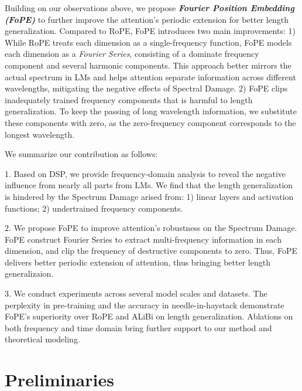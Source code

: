 Building on our observations above, we propose \textbf{\textit{Fourier Position Embedding (FoPE)}} to further improve the attention's periodic extension for better length generalization. Compared to RoPE, FoPE introduces two main improvements:
1) While RoPE treats each dimension as a single-frequency function, FoPE models each dimension as a \textit{Fourier Series}, consisting of a dominate frequency component and several harmonic components. This approach better mirrors the actual spectrum in LMs and helps attention separate information across different wavelengths, mitigating the negative effects of Spectral Damage.
2) FoPE clips inadequately trained frequency components that is harmful to length generalization. To keep the passing of long wavelength information, we substitute these components with zero, as the zero-frequency component corresponds to the longest wavelength.

We summarize our contribution as follows:

    1. Based on DSP, we provide frequency-domain analysis to reveal the negative influence from nearly all parts from LMs. We find that the length generalization is hindered by the Spectrum Damage arised from: 1) linear layers and activation functions; 2) undertrained frequency components. 

    2. We propose FoPE to improve attention's robustness on the Spectrum Damage. FoPE construct Fourier Series to extract multi-frequency information in each dimension, and clip the frequency of destructive components to zero. Thus, FoPE delivers better periodic extension of attention, thus bringing better length generalizaion.

    3. We conduct experiments across several model scales and datasets. The perplexity in pre-training and the accuracy in needle-in-haystack demonstrate FoPE's superiority over RoPE and ALiBi on length generalization. Ablations on both frequency and time domain bring further support to our method and theoretical modeling.
    
    
    

\section{Preliminaries}
